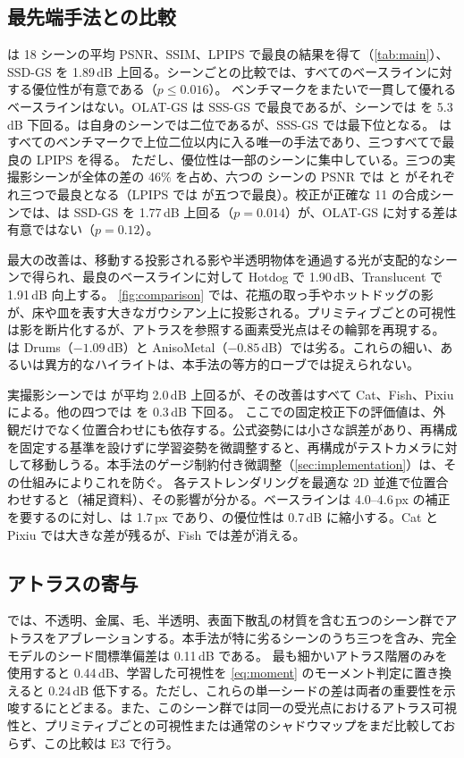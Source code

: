 \subsection{最先端手法との比較}
\label{sec:exp_main}
\ours は 18 シーンの平均 PSNR、SSIM、LPIPS で最良の結果を得て（\cref{tab:main}）、SSD-GS を 1.89\,dB 上回る。シーンごとの比較では、すべてのベースラインに対する優位性が有意である（$p\le0.016$）。
ベンチマークをまたいで一貫して優れるベースラインはない。OLAT-GS は SSS-GS で最良であるが、\gsthree シーンでは \ours を 5.3\,dB 下回る。\gsthree は自身のシーンでは二位であるが、SSS-GS では最下位となる。
\ours はすべてのベンチマークで上位二位以内に入る唯一の手法であり、三つすべてで最良の LPIPS を得る。
ただし、優位性は一部のシーンに集中している。三つの実撮影シーンが全体の差の 46\% を占め、六つの \gsthree シーンの PSNR では \ours と \gsthree がそれぞれ三つで最良となる（LPIPS では \ours が五つで最良）。校正が正確な 11 の合成シーンでは、\ours は SSD-GS を 1.77\,dB 上回る（$p=0.014$）が、OLAT-GS に対する差は有意ではない（$p=0.12$）。

最大の改善は、移動する投影される影や半透明物体を通過する光が支配的なシーンで得られ、最良のベースラインに対して Hotdog で 1.90\,dB、Translucent で 1.91\,dB 向上する。
\cref{fig:comparison} では、花瓶の取っ手やホットドッグの影が、床や皿を表す大きなガウシアン上に投影される。プリミティブごとの可視性は影を断片化するが、アトラスを参照する画素受光点はその輪郭を再現する。
\ours は Drums（$-1.09$\,dB）と AnisoMetal（$-0.85$\,dB）では劣る。これらの細い、あるいは異方的なハイライトは、本手法の等方的ローブでは捉えられない。

実撮影シーンでは \ours が平均 2.0\,dB 上回るが、その改善はすべて Cat、Fish、Pixiu による。他の四つでは \gsthree を 0.3\,dB 下回る。
ここでの固定校正下の評価値は、外観だけでなく位置合わせにも依存する。公式姿勢には小さな誤差があり、再構成を固定する基準を設けずに学習姿勢を微調整すると、再構成がテストカメラに対して移動しうる。本手法のゲージ制約付き微調整（\cref{sec:implementation}）は、その仕組みによりこれを防ぐ。
各テストレンダリングを最適な 2D 並進で位置合わせすると（補足資料）、その影響が分かる。ベースラインは 4.0--4.6\,px の補正を要するのに対し、\ours は 1.7\,px であり、\ours の優位性は 0.7\,dB に縮小する。Cat と Pixiu では大きな差が残るが、Fish では差が消える。



\subsection{アトラスの寄与}
\label{sec:exp_atlas}
 では、不透明、金属、毛、半透明、表面下散乱の材質を含む五つのシーン群でアトラスをアブレーションする。本手法が特に劣るシーンのうち三つを含み、完全モデルのシード間標準偏差は 0.11\,dB である。
最も細かいアトラス階層のみを使用すると 0.44\,dB、学習した可視性を \cref{eq:moment} のモーメント判定に置き換えると 0.24\,dB 低下する。ただし、これらの単一シードの差は両者の重要性を示唆するにとどまる。また、このシーン群では同一の受光点におけるアトラス可視性と、プリミティブごとの可視性または通常のシャドウマップをまだ比較しておらず、この比較は E3 で行う。

